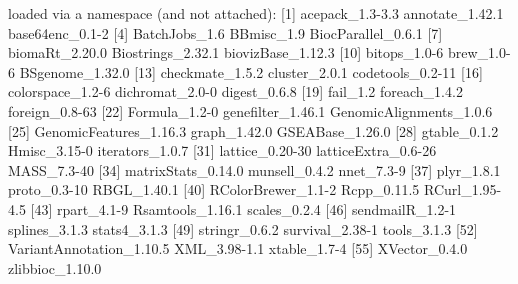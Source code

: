 \documentclass[11pt]{article}
\begin{document}
\begin{Schunk}
\begin{Soutput}
loaded via a namespace (and not attached):
 [1] acepack_1.3-3.3          annotate_1.42.1          base64enc_0.1-2         
 [4] BatchJobs_1.6            BBmisc_1.9               BiocParallel_0.6.1      
 [7] biomaRt_2.20.0           Biostrings_2.32.1        biovizBase_1.12.3       
[10] bitops_1.0-6             brew_1.0-6               BSgenome_1.32.0         
[13] checkmate_1.5.2          cluster_2.0.1            codetools_0.2-11        
[16] colorspace_1.2-6         dichromat_2.0-0          digest_0.6.8            
[19] fail_1.2                 foreach_1.4.2            foreign_0.8-63          
[22] Formula_1.2-0            genefilter_1.46.1        GenomicAlignments_1.0.6 
[25] GenomicFeatures_1.16.3   graph_1.42.0             GSEABase_1.26.0         
[28] gtable_0.1.2             Hmisc_3.15-0             iterators_1.0.7         
[31] lattice_0.20-30          latticeExtra_0.6-26      MASS_7.3-40             
[34] matrixStats_0.14.0       munsell_0.4.2            nnet_7.3-9              
[37] plyr_1.8.1               proto_0.3-10             RBGL_1.40.1             
[40] RColorBrewer_1.1-2       Rcpp_0.11.5              RCurl_1.95-4.5          
[43] rpart_4.1-9              Rsamtools_1.16.1         scales_0.2.4            
[46] sendmailR_1.2-1          splines_3.1.3            stats4_3.1.3            
[49] stringr_0.6.2            survival_2.38-1          tools_3.1.3             
[52] VariantAnnotation_1.10.5 XML_3.98-1.1             xtable_1.7-4            
[55] XVector_0.4.0            zlibbioc_1.10.0         
\end{Soutput}
\end{Schunk}

\newpage

\vspace{2cm}
\end{document}

